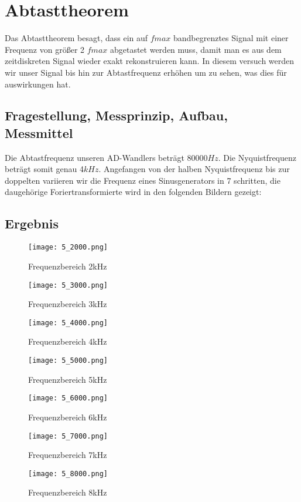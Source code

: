 %
%
\chapter{Abtasttheorem}
Das Abtasttheorem besagt, dass ein auf $fmax$ bandbegrenztes Signal mit einer Frequenz von größer 2 \cdot $fmax$ abgetastet werden muss, damit man es aus dem zeitdiskreten Signal wieder exakt rekonstruieren kann.
In diesem versuch werden wir unser Signal bis hin zur Abtastfrequenz erhöhen um zu sehen, was dies für auswirkungen hat.
\label{chap:Abtasttheorem}
\section{Fragestellung, Messprinzip, Aufbau, Messmittel}
\label{chap:VERSUCH_5_FRAGESTELLUNG}
Die Abtastfrequenz unseren AD-Wandlers beträgt 80000$Hz$. Die Nyquistfrequenz beträgt somit genau 4$kHz$.
Angefangen von der halben Nyquistfrequenz bis zur doppelten variieren wir die Frequenz eines Sinusgenerators in 7 schritten, die daugehörige Foriertransformierte wird in den folgenden Bildern gezeigt:
\section{Ergebnis}
\label{chap:VERSUCH_5_MESSWERTE}

\begin{figure}[H]
\centering
\texttt{[image: 5\_2000.png]}
\caption{Frequenzbereich 2kHz}
\label{fig:F2}
\end{figure}
\begin{figure}[H]
\centering
\texttt{[image: 5\_3000.png]}
\caption{Frequenzbereich 3kHz}
\label{fig:F3}
\end{figure}
\begin{figure}[H]
\centering
\texttt{[image: 5\_4000.png]}
\caption{Frequenzbereich 4kHz}
\label{fig:F4}
\end{figure}
\begin{figure}[H]
\centering
\texttt{[image: 5\_5000.png]}
\caption{Frequenzbereich 5kHz}
\label{fig:F5}
\end{figure}
\begin{figure}[H]
\centering
\texttt{[image: 5\_6000.png]}
\caption{Frequenzbereich 6kHz}
\label{fig:F6}
\end{figure}
\begin{figure}[H]
\centering
\texttt{[image: 5\_7000.png]}
\caption{Frequenzbereich 7kHz}
\label{fig:F7}
\end{figure}
\begin{figure}[H]
\centering
\texttt{[image: 5\_8000.png]}
\caption{Frequenzbereich 8kHz}
\label{fig:F8}
\end{figure}



